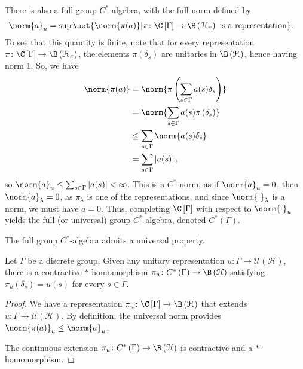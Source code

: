 \documentclass[10pt]{mypackage}
\begin{document}
There is also a full group $C^{\ast}$-algebra, with the full norm defined by
\begin{align*}
  \norm{a}_{u} &= \sup\set{\norm{\pi(a)} | \pi\colon \C\left[\Gamma\right]\rightarrow \B\left(\mathcal{H}_{\pi}\right)\text{ is a representation}}.
\end{align*}
To see that this quantity is finite, note that for every representation $\pi\colon \C\left[\Gamma\right]\rightarrow \B\left(\mathcal{H}_{\pi}\right)$, the elements $\pi\left(\delta_s\right)$ are unitaries in $\B\left(\mathcal{H}\right)$, hence having norm $1$. So, we have
\begin{align*}
  \norm{\pi(a)} &= \norm{\pi\left(\sum_{s\in\Gamma}a(s)\delta_s\right)}\\
                &= \norm{\sum_{s\in\Gamma}a(s)\pi\left(\delta_s\right)}\\
                &\leq \sum_{s\in\Gamma}\norm{a(s)\delta_s}\\
                &= \sum_{s\in\Gamma}\left\vert a(s) \right\vert,
\end{align*}
so $\norm{a}_{u}\leq \sum_{s\in\Gamma}\left\vert a(s) \right\vert < \infty$. This is a $C^{\ast}$-norm, as if $\norm{a}_{u} = 0$, then $\norm{a}_{\lambda}=0$, as $\pi_{\lambda}$ is one of the representations, and since $\norm{\cdot}_{\lambda}$ is a norm, we must have $a = 0$. Thus, completing $\C\left[\Gamma\right]$ with respect to $\norm{\cdot}_u$ yields the full (or universal) group $C^{\ast}$-algebra, denoted $C^{\ast}\left(\Gamma\right)$.\newline

The full group $C^{\ast}$-algebra admits a universal property.
\begin{proposition}
  Let $\Gamma$ be a discrete group. Given any unitary representation $u\colon \Gamma\rightarrow \mathcal{U}\left(\mathcal{H}\right)$, there is a contractive $\ast$-homomorphism $\pi_u\colon C^{\ast}\left(\Gamma\right)\rightarrow \B\left(\mathcal{H}\right)$ satisfying $\pi_u\left(\delta_s\right) = u(s)$ for every $s\in\Gamma$.
\end{proposition}
\begin{proof}
  We have a representation $\pi_u\colon \C\left[\Gamma\right]\rightarrow \B\left(\mathcal{H}\right)$ that extends $u\colon \Gamma\rightarrow \mathcal{U}\left(\mathcal{H}\right)$. By definition, the universal norm provides $\norm{\pi(a)}_{u} \leq \norm{a}_u$.\newline

  The continuous extension $\pi_u\colon C^{\ast}\left(\Gamma\right)\rightarrow \B\left(\mathcal{H}\right)$ is contractive and a $\ast$-homomorphism.
\end{proof}
\end{document}

